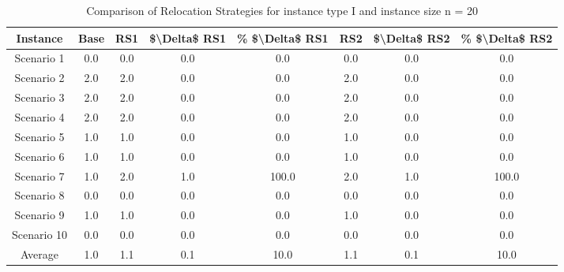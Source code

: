 \begin{table}[H]
\centering
\begin{tabular}{cccccccc}
  \hline
  \textbf{Instance} & \textbf{Base} & \textbf{RS1} & \textbf{\$\textbackslash{}Delta\$  RS1} & \textbf{\% \$\textbackslash{}Delta\$  RS1} & \textbf{RS2} & \textbf{\$\textbackslash{}Delta\$  RS2} & \textbf{\% \$\textbackslash{}Delta\$  RS2} \\\hline
  Scenario 1 & 0.0 & 0.0 & 0.0 & 0.0 & 0.0 & 0.0 & 0.0 \\
  Scenario 2 & 2.0 & 2.0 & 0.0 & 0.0 & 2.0 & 0.0 & 0.0 \\
  Scenario 3 & 2.0 & 2.0 & 0.0 & 0.0 & 2.0 & 0.0 & 0.0 \\
  Scenario 4 & 2.0 & 2.0 & 0.0 & 0.0 & 2.0 & 0.0 & 0.0 \\
  Scenario 5 & 1.0 & 1.0 & 0.0 & 0.0 & 1.0 & 0.0 & 0.0 \\
  Scenario 6 & 1.0 & 1.0 & 0.0 & 0.0 & 1.0 & 0.0 & 0.0 \\
  Scenario 7 & 1.0 & 2.0 & 1.0 & 100.0 & 2.0 & 1.0 & 100.0 \\
  Scenario 8 & 0.0 & 0.0 & 0.0 & 0.0 & 0.0 & 0.0 & 0.0 \\
  Scenario 9 & 1.0 & 1.0 & 0.0 & 0.0 & 1.0 & 0.0 & 0.0 \\
  Scenario 10 & 0.0 & 0.0 & 0.0 & 0.0 & 0.0 & 0.0 & 0.0 \\
  Average & 1.0 & 1.1 & 0.1 & 10.0 & 1.1 & 0.1 & 10.0 \\\hline
\end{tabular}
\caption{Comparison of Relocation Strategies for instance type I and instance size n = 20}
\label{tab:wait:resrelocation-comparison_I_20}
\end{table}
